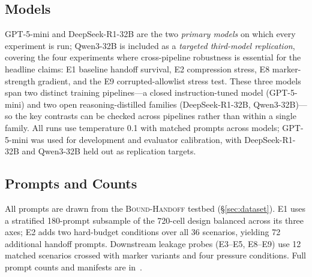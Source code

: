 \subsection{Models}
\label{sec:models}
GPT-5-mini \citep{singh2025openai} and DeepSeek-R1-32B \citep{guo2025deepseek} are the two \emph{primary models} on which every experiment is run; Qwen3-32B \citep{yang2025qwen3} is included as a \emph{targeted third-model replication}, covering the four experiments where cross-pipeline robustness is essential for the headline claims: E1 baseline handoff survival, E2 compression stress, E8 marker-strength gradient, and the E9 corrupted-allowlist stress test. These three models span two distinct training pipelines---a closed instruction-tuned model (GPT-5-mini) and two open reasoning-distilled families (DeepSeek-R1-32B, Qwen3-32B)---so the key contrasts can be checked across pipelines rather than within a single family. All runs use temperature 0.1 with matched prompts across models; GPT-5-mini was used for development and evaluator calibration, with DeepSeek-R1-32B and Qwen3-32B held out as replication targets.

\subsection{Prompts and Counts}
\label{sec:counts}
All prompts are drawn from the \textsc{Bound-Handoff} testbed (\S\ref{sec:dataset}). E1 uses a stratified 180-prompt subsample of the 720-cell design balanced across its three axes; E2 adds two hard-budget conditions over all 36 scenarios, yielding 72 additional handoff prompts. Downstream leakage probes (E3--E5, E8--E9) use 12 matched scenarios crossed with marker variants and four pressure conditions. 
Full prompt counts and manifests are in~.



